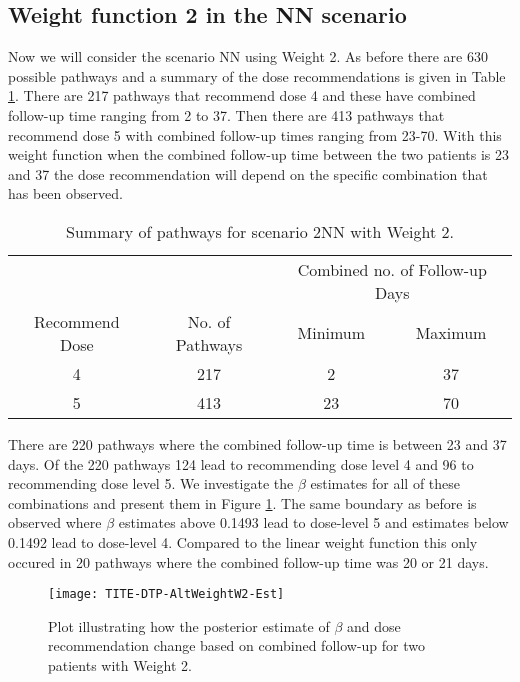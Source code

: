 \subsection{Weight function 2 in the NN scenario}
\label{tite-dtp:AltWeightFunc-w2}

Now we will consider the scenario NN using Weight 2. As before there are 630 possible pathways and a summary of the dose recommendations is given in Table \ref{tab_tite-dtp:AltWeightW2Summ}. There are 217 pathways that recommend dose 4 and these have combined follow-up time ranging from 2 to 37. Then there are 413 pathways that recommend dose 5 with combined follow-up times ranging from 23-70. With this weight function when the combined follow-up time between the two patients is 23 and 37 the dose recommendation will depend on the specific combination that has been observed. 

\begin{table}[H]
	\centering
	\caption{Summary of pathways for scenario 2NN with Weight 2.}
	\label{tab_tite-dtp:AltWeightW2Summ}
	\begin{tabular}{cccc}
		\hline
		\multicolumn{1}{l}{} & \multicolumn{1}{l}{} & \multicolumn{2}{c}{Combined no. of Follow-up Days} \\ \cline{3-4} 
		Recommend Dose & No. of Pathways & Minimum & Maximum \\ \hline
		4              & 217             & 2       & 37      \\
		5              & 413             & 23      & 70      \\ \hline
	\end{tabular}
\end{table}

There are 220 pathways where the combined follow-up time is between 23 and 37 days. Of the 220 pathways 124 lead to recommending dose level 4 and 96 to recommending dose level 5. We investigate the $\beta$ estimates for all of these combinations and present them in Figure \ref{fig_tite-dtp:AltWeightW2AllCombs}. The same boundary as before is observed where $\beta$ estimates above 0.1493 lead to dose-level 5 and estimates below 0.1492 lead to dose-level 4. Compared to the linear weight function this only occured in 20 pathways where the combined follow-up time was 20 or 21 days. 

\begin{figure}[h!]
	\centering
	\caption[Changes in $\beta$ based on combined follow-up for two patients with Weight 2.]{Plot illustrating how the posterior estimate of $\beta$ and dose recommendation change based on combined follow-up for two patients with Weight 2.}
	\label{fig_tite-dtp:AltWeightW2AllCombs}
	\texttt{[image: TITE-DTP-AltWeightW2-Est]}
\end{figure}

